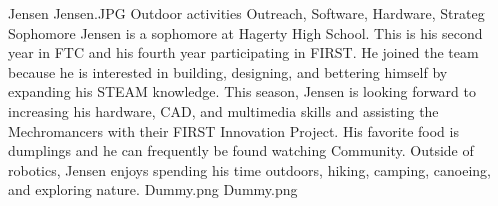 \insertbio
{Jensen}
{Jensen.JPG}
{Outdoor activities}
{Outreach, Software, Hardware, Strateg}
{Sophomore}
{
Jensen is a sophomore at Hagerty High School. This is his second year in FTC and his fourth year participating in FIRST. He joined the team because he is interested in building, designing, and bettering himself by expanding his STEAM knowledge. This season, Jensen is looking forward to increasing his hardware, CAD, and multimedia skills and assisting the Mechromancers with their FIRST Innovation Project. His favorite food is dumplings and he can frequently be found watching Community. Outside of robotics, Jensen enjoys spending his time outdoors, hiking, camping, canoeing, and exploring nature. 
}
{Dummy.png}
{Dummy.png}
